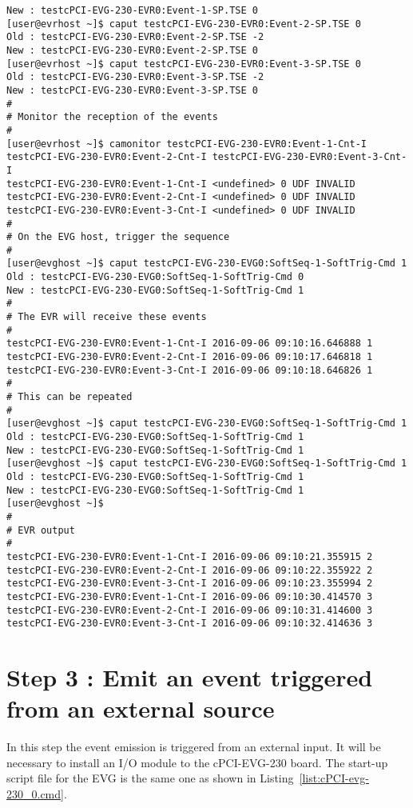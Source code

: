 \documentclass[11pt
  , a4paper
  , article
  , oneside
  , showtrims
]{memoir}
\begin{document}
\begin{lstlisting}[style=termstyle]
New : testcPCI-EVG-230-EVR0:Event-1-SP.TSE 0
[user@evrhost ~]$ caput testcPCI-EVG-230-EVR0:Event-2-SP.TSE 0
Old : testcPCI-EVG-230-EVR0:Event-2-SP.TSE -2
New : testcPCI-EVG-230-EVR0:Event-2-SP.TSE 0
[user@evrhost ~]$ caput testcPCI-EVG-230-EVR0:Event-3-SP.TSE 0
Old : testcPCI-EVG-230-EVR0:Event-3-SP.TSE -2
New : testcPCI-EVG-230-EVR0:Event-3-SP.TSE 0
#
# Monitor the reception of the events
#
[user@evrhost ~]$ camonitor testcPCI-EVG-230-EVR0:Event-1-Cnt-I testcPCI-EVG-230-EVR0:Event-2-Cnt-I testcPCI-EVG-230-EVR0:Event-3-Cnt-I
testcPCI-EVG-230-EVR0:Event-1-Cnt-I <undefined> 0 UDF INVALID
testcPCI-EVG-230-EVR0:Event-2-Cnt-I <undefined> 0 UDF INVALID
testcPCI-EVG-230-EVR0:Event-3-Cnt-I <undefined> 0 UDF INVALID
#
# On the EVG host, trigger the sequence
#
[user@evghost ~]$ caput testcPCI-EVG-230-EVG0:SoftSeq-1-SoftTrig-Cmd 1
Old : testcPCI-EVG-230-EVG0:SoftSeq-1-SoftTrig-Cmd 0
New : testcPCI-EVG-230-EVG0:SoftSeq-1-SoftTrig-Cmd 1
#
# The EVR will receive these events
#
testcPCI-EVG-230-EVR0:Event-1-Cnt-I 2016-09-06 09:10:16.646888 1  
testcPCI-EVG-230-EVR0:Event-2-Cnt-I 2016-09-06 09:10:17.646818 1  
testcPCI-EVG-230-EVR0:Event-3-Cnt-I 2016-09-06 09:10:18.646826 1
#
# This can be repeated
#
[user@evghost ~]$ caput testcPCI-EVG-230-EVG0:SoftSeq-1-SoftTrig-Cmd 1
Old : testcPCI-EVG-230-EVG0:SoftSeq-1-SoftTrig-Cmd 1
New : testcPCI-EVG-230-EVG0:SoftSeq-1-SoftTrig-Cmd 1
[user@evghost ~]$ caput testcPCI-EVG-230-EVG0:SoftSeq-1-SoftTrig-Cmd 1
Old : testcPCI-EVG-230-EVG0:SoftSeq-1-SoftTrig-Cmd 1
New : testcPCI-EVG-230-EVG0:SoftSeq-1-SoftTrig-Cmd 1
[user@evghost ~]$ 
#
# EVR output
#
testcPCI-EVG-230-EVR0:Event-1-Cnt-I 2016-09-06 09:10:21.355915 2  
testcPCI-EVG-230-EVR0:Event-2-Cnt-I 2016-09-06 09:10:22.355922 2  
testcPCI-EVG-230-EVR0:Event-3-Cnt-I 2016-09-06 09:10:23.355994 2  
testcPCI-EVG-230-EVR0:Event-1-Cnt-I 2016-09-06 09:10:30.414570 3  
testcPCI-EVG-230-EVR0:Event-2-Cnt-I 2016-09-06 09:10:31.414600 3  
testcPCI-EVG-230-EVR0:Event-3-Cnt-I 2016-09-06 09:10:32.414636 3
\end{lstlisting}



\section{Step 3 : Emit an event triggered from an external source}
In this step the event emission is triggered from an external input. It will be necessary to install an I/O module to the cPCI-EVG-230 board. The start-up script file for the EVG is the same one as shown in Listing~\ref{list:cPCI-evg-230_0.cmd}.
\end{document}
